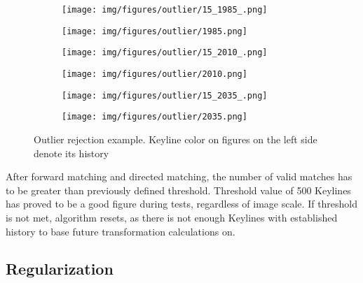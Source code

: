 \begin{figure}[h]
	\centering
	\begin{subfigure}{0.35\textwidth}
		\centering\texttt{[image: img/figures/outlier/15\_1985\_.png]}
		\subcaption{\label{subfigure_a}}
	\end{subfigure}
	\begin{subfigure}{0.35\textwidth}
		\centering\texttt{[image: img/figures/outlier/1985.png]}
		\subcaption{\label{subfigure_a1}}
	\end{subfigure}
	\begin{subfigure}{0.35\textwidth}
		\centering\texttt{[image: img/figures/outlier/15\_2010\_.png]}
		\subcaption{\label{subfigure_b}}
	\end{subfigure}
	\begin{subfigure}{0.35\textwidth}
		\centering\texttt{[image: img/figures/outlier/2010.png]}
		\subcaption{\label{subfigure_b1}}
	\end{subfigure}
	\begin{subfigure}{0.35\textwidth}
		\centering\texttt{[image: img/figures/outlier/15\_2035\_.png]}
		\subcaption{\label{subfigure_c}}
	\end{subfigure}
	\begin{subfigure}{0.35\textwidth}
		\centering\texttt{[image: img/figures/outlier/2035.png]}
		\subcaption{\label{subfigure_c}}
	\end{subfigure}
	
	\caption{\label{fig:subfigure_outliers} Outlier rejection example. Keyline color on figures on the left side denote its history}
\end{figure}

After forward matching and directed matching, the number of valid matches has to be greater than previously defined threshold. Threshold value of 500 Keylines has proved to be a good figure during tests, regardless of image scale.  If threshold is not met, algorithm resets, as there is not enough Keylines with established history to base future transformation calculations on.

\subsection{Regularization}

